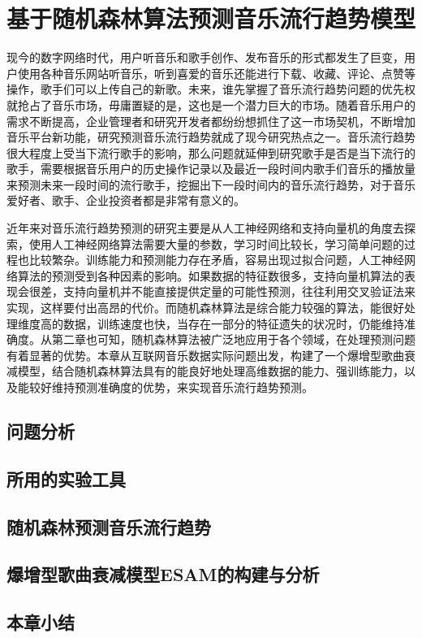 \chapter{基于随机森林算法预测音乐流行趋势模型}
现今的数字网络时代，用户听音乐和歌手创作、发布音乐的形式都发生了巨变，用户使用各种音乐网站听音乐，听到喜爱的音乐还能进行下载、收藏、评论、点赞等操作，歌手们可以上传自己的新歌。未来，谁先掌握了音乐流行趋势问题的优先权就抢占了音乐市场，毋庸置疑的是，这也是一个潜力巨大的市场。随着音乐用户的需求不断提高，企业管理者和研究开发者都纷纷想抓住了这一市场契机，不断增加音乐平台新功能，研究预测音乐流行趋势就成了现今研究热点之一。音乐流行趋势很大程度上受当下流行歌手的影响，那么问题就延伸到研究歌手是否是当下流行的歌手，需要根据音乐用户的历史操作记录以及最近一段时间内歌手们音乐的播放量来预测未来一段时间的流行歌手，挖掘出下一段时间内的音乐流行趋势，对于音乐爱好者、歌手、企业投资者都是非常有意义的。

近年来对音乐流行趋势预测的研究主要是从人工神经网络和支持向量机的角度去探索，使用人工神经网络算法需要大量的参数，学习时间比较长，学习简单问题的过程也比较繁杂。训练能力和预测能力存在矛盾，容易出现过拟合问题，人工神经网络算法的预测受到各种因素的影响。如果数据的特征数很多，支持向量机算法的表现会很差，支持向量机并不能直接提供定量的可能性预测，往往利用交叉验证法来实现，这样要付出高昂的代价。而随机森林算法是综合能力较强的算法，能很好处理维度高的数据，训练速度也快，当存在一部分的特征遗失的状况时，仍能维持准确度。从第二章也可知，随机森林算法被广泛地应用于各个领域，在处理预测问题有着显著的优势。本章从互联网音乐数据实际问题出发，构建了一个爆增型歌曲衰减模型，结合随机森林算法具有的能良好地处理高维数据的能力、强训练能力，以及能较好维持预测准确度的优势，来实现音乐流行趋势预测。

\section{问题分析}

\section{所用的实验工具}

\section{随机森林预测音乐流行趋势}

\section{爆增型歌曲衰减模型ESAM的构建与分析}

\section{本章小结}